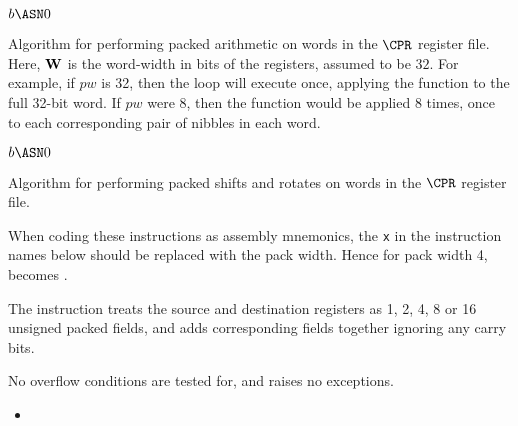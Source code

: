 \begin{algorithm}
    $b   \ASN 0 $\;
\caption{Algorithm for performing packed arithmetic on words in the 
$\CPR$ register file. Here, ${\bf W}$ is the word-width in bits of the
registers, assumed to be $32$. For example, if $pw$ is 32, then the loop
will execute once, applying the function to the full 32-bit word. If $pw$
were $8$, then the function would be applied $8$ times, once to each
corresponding pair of nibbles in each word.}
\end{algorithm}

\begin{algorithm}
    $b   \ASN 0 $\;
\caption{Algorithm for performing packed shifts and rotates on words in the 
$\CPR$ register file.}
\end{algorithm}

When coding these instructions as assembly mnemonics, the {\tt x} in the
instruction names below should be replaced with the pack width. Hence
for pack width 4,  becomes .

\ienc{\iencaddpx}

The instruction  treats the source and destination registers as
1, 2, 4, 8 or 16 unsigned packed fields, and adds corresponding fields
together ignoring any carry bits.

No overflow conditions are tested for, and  raises no exceptions.

\begin{itemize}
\item {}
\end{itemize}

\ienc{\iencsubpx}

